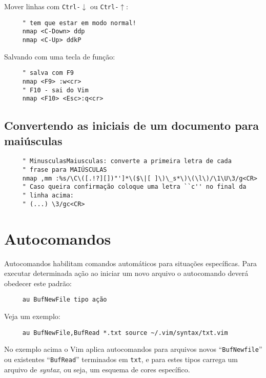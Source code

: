 Mover linhas com {\tt Ctrl-$\downarrow$} ou {\tt Ctrl-$\uparrow$}:

\begin{verbatim}
     " tem que estar em modo normal!
     nmap <C-Down> ddp
     nmap <C-Up> ddkP
\end{verbatim}

Salvando com uma tecla de função:

\begin{verbatim}
     " salva com F9
     nmap <F9> :w<cr>
     " F10 - sai do Vim
     nmap <F10> <Esc>:q<cr>
\end{verbatim}

\subsection{Convertendo as iniciais de um documento para maiúsculas}
\label{Convertendo as iniciais de um documento para maiúsculas}

\begin{verbatim}
     " MinusculasMaiusculas: converte a primeira letra de cada
     " frase para MAIÚSCULAS
     nmap ,mm :%s/\C\([.!?][])"']*\($\|[ ]\)\_s*\)\(\l\)/\1\U\3/g<CR>
     " Caso queira confirmação coloque uma letra ``c'' no final da 
     " linha acima:
     " (...) \3/gc<CR>
\end{verbatim}

\section{Autocomandos }
\label{Autocomandos }

Autocomandos habilitam comandos automáticos para situações
específicas. Para executar determinada ação ao
iniciar um novo arquivo o autocomando deverá obedecer este padrão:

\begin{verbatim}
     au BufNewFile tipo ação
\end{verbatim}

Veja um exemplo:

\begin{verbatim}
     au BufNewFile,BufRead *.txt source ~/.vim/syntax/txt.vim
\end{verbatim}

No exemplo acima o Vim aplica autocomandos para arquivos novos
``{\tt BufNewfile}'' ou existentes ``{\tt BufRead}'' terminados em \verb|txt|, e para
estes tipos carrega um arquivo de {\em syntax}, ou seja, um esquema de cores
específico.

